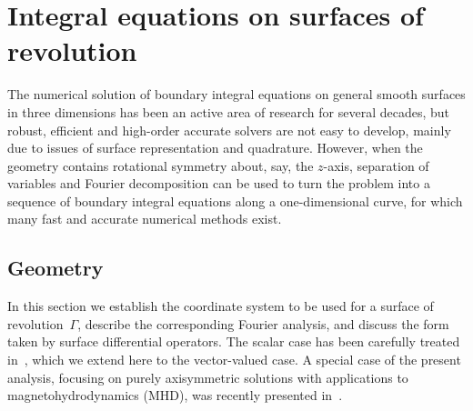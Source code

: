 \documentclass[11pt]{article}
\numberwithin{equation}{section}
\begin{document}
\section{Integral equations on surfaces of revolution}
\label{sec_revolution}

The numerical solution of boundary integral equations on general
smooth surfaces in three dimensions has been an active area of
research for several decades, but robust, efficient and high-order accurate 
solvers are not easy to develop, mainly due to issues of surface 
representation and quadrature. However, when the geometry contains
rotational symmetry about, say, the $z$-axis, separation of variables
and Fourier decomposition can be used to turn the problem into a
sequence of boundary integral equations along a one-dimensional curve,
for which many fast and accurate numerical methods exist. 

\subsection{Geometry}
\label{sec_geometry}

In this section we establish the coordinate system to be used for a surface of
revolution~$\Gamma$, describe the corresponding Fourier analysis, and discuss
the form taken by surface differential operators. 
The scalar case has been carefully treated
in~\cite{young,helsing_2014}, which we extend here to the vector-valued case.
A special case of the present analysis, focusing on purely axisymmetric solutions
with applications to magnetohydrodynamics (MHD), 
was recently presented in~\cite{oneil2018taylor}. 
\end{document}
